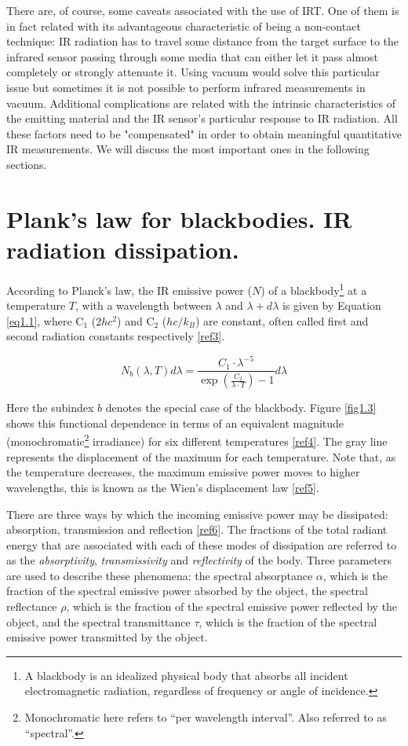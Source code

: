 		There are, of course, some caveats associated with the use of IRT. One of them is in fact related with its advantageous characteristic of being a non-contact technique: IR radiation has to travel some distance from the target surface to the infrared sensor passing through some media that can either let it pass almost completely or strongly attenuate it. Using vacuum would solve this particular issue but sometimes it is not possible to perform infrared measurements in vacuum. Additional complications are related with the intrinsic characteristics of the emitting material and the IR sensor's particular response to IR radiation. All these factors need to be "compensated" in order to obtain meaningful quantitative IR measurements. We will discuss the most important ones in the following sections.
		
	\section{Plank's law for blackbodies. IR radiation dissipation.}\label{section1.2}
	
		According to Planck’s law, the IR emissive power ($N$) of a blackbody\footnote{{\footnotesize A blackbody is an idealized physical body that absorbs all incident electromagnetic radiation, regardless of frequency or angle of incidence.}} at a temperature $T$, with a wavelength between $\lambda$ and $\lambda+d\lambda$ is given by Equation \ref{eq1.1}, where C$_{1}$ ($2hc^2$) and C$_{2}$ ($hc/k_{B}$) are constant, often called first and second radiation constants respectively \ref{ref3}.
		
		\begin{equation}\label{eq1.1}
			N_{b}(\lambda,T)d\lambda=\frac{C_{1} \cdot \lambda^{-5}}{\exp (\frac{C_{2}}{\lambda\cdot T}) -1} d\lambda
		\end{equation}\bigskip
		
		Here the subindex $b$ denotes the special case of the blackbody. Figure \ref{fig1.3} shows this functional dependence in terms of an equivalent magnitude (monochromatic\footnote{{\footnotesize Monochromatic here refers to “per wavelength interval”. Also referred to as “spectral”.}} irradiance) for six different temperatures \ref{ref4}. The gray line represents the displacement of the maximum for each temperature. Note that, as the temperature decreases, the maximum emissive power moves to higher wavelengths, this is known as the Wien’s displacement law \ref{ref5}.
		
		There are three ways by which the incoming emissive power may be dissipated: absorption, transmission and reflection \ref{ref6}. The fractions of the total radiant energy that are associated with each of these modes of dissipation are referred to as the \textit{absorptivity}, \textit{transmissivity} and \textit{reflectivity} of the body. Three parameters are used to describe these phenomena: the spectral absorptance $\alpha$, which is the fraction of the spectral emissive power absorbed by the object, the spectral reflectance $\rho$, which is the fraction of the spectral emissive power reflected by the object, and the spectral transmittance $\tau$, which is the fraction of the spectral emissive power transmitted by the object.
		
